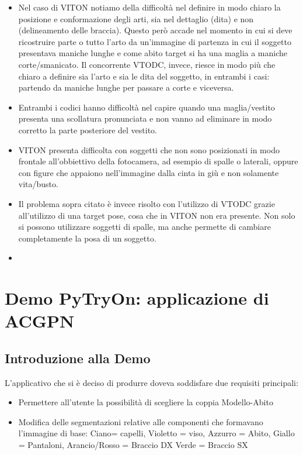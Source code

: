 \documentclass[final, 11pt]{article}
\begin{document}
	\begin{itemize}
		\item 	Nel caso di VITON notiamo della difficoltà nel definire in modo chiaro la posizione e conformazione degli arti, sia nel dettaglio (dita) e non (delineamento delle braccia). Questo però accade nel momento in cui si deve ricostruire parte o tutto l’arto da un’immagine di partenza in cui il soggetto presentava maniche lunghe e come abito target si ha una maglia a maniche corte/smanicato.
		Il concorrente VTODC, invece, riesce in modo più che chiaro a definire sia l’arto e sia le dita del soggetto, in entrambi i casi: partendo da maniche lunghe per passare a corte e viceversa.
		\item Entrambi i codici hanno difficoltà nel capire quando una maglia/vestito presenta una scollatura pronunciata e non vanno ad eliminare in modo corretto la parte posteriore del vestito.
		\item	VITON presenta difficolta con soggetti che non sono posizionati in modo frontale all’obbiettivo della fotocamera, ad esempio di spalle o laterali, oppure con figure che appaiono nell’immagine dalla cinta in giù e non solamente vita/busto. 
		\item	Il problema sopra citato è invece risolto con l’utilizzo di VTODC grazie all’utilizzo di una target pose, cosa che in VITON non era presente.
		Non solo si possono utilizzare soggetti di spalle, ma anche permette di cambiare completamente la posa di un soggetto.
		\item 
		
	\end{itemize}
	
	
	\newpage
	\section{Demo PyTryOn: applicazione di ACGPN}
	\subsection{Introduzione alla Demo}
	L’applicativo che si è deciso di produrre doveva soddisfare due requisiti principali:
	\begin{itemize}
		\item Permettere all’utente la possibilità di scegliere la coppia Modello-Abito
		\item Modifica delle segmentazioni relative alle componenti che formavano l’immagine di base:
		Ciano= capelli, Violetto = viso, Azzurro = Abito, Giallo = Pantaloni, Arancio/Rosso = Braccio DX
		Verde = Braccio SX
	\end{itemize}
\end{document}
